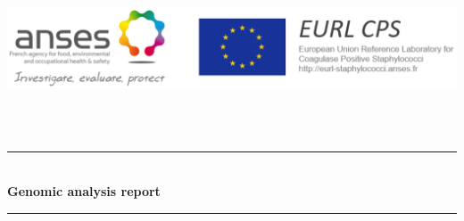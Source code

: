 \documentclass[a4paper]{article}
\begin{document}
\begin{titlepage}

\newcommand{\HRule}{\rule{\linewidth}{0.5mm}} %
\setlength{\topmargin}{0in}

\begin{minipage}{0.4\textwidth}
\begin{flushleft} \large
\hspace*{-0.5cm}
\includegraphics[scale=0.65]{latex_images/Anses-EURL.png}\\ 
\end{flushleft}
\end{minipage}\\[2cm]
~
\center %



\HRule \\[0.4cm]
{ \huge \bfseries Genomic analysis report}\\[0.4cm] %
\HRule \\[1cm]
 

\end{titlepage}
\end{document}
